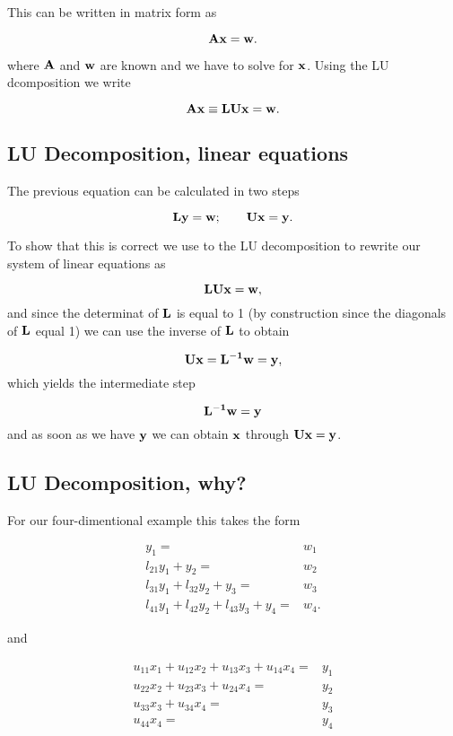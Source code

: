 \documentclass[%
twoside,                 %
final,                   %
10pt]{article}
\begin{document}
{{{{This can be written in matrix form as

\[ {\bf Ax}={\bf w}. \]

where ${\bf A}$ and ${\bf w}$ are known and we have to solve for
${\bf x}$. Using the LU dcomposition we write

\[ {\bf A} {\bf x} \equiv {\bf L} {\bf U} {\bf x} ={\bf w}. \]

\subsection{LU Decomposition, linear equations}

The previous equation can be calculated in two steps

\[ {\bf L} {\bf y} = {\bf w};\qquad {\bf Ux}={\bf y}. \]

To show that this is correct we use to the LU decomposition
to rewrite our system of linear equations as

\[  {\bf LUx}={\bf w}, \]
and since the determinat of ${\bf L}$ is equal to 1 (by construction
since the diagonals of ${\bf L}$ equal 1) we can use the inverse of
${\bf L}$ to obtain

\[
   {\bf Ux}={\bf L^{-1}w}={\bf y},
\]
which yields the intermediate step

\[
   {\bf L^{-1}w}={\bf y}
\]
and as soon as we have ${\bf y}$ we can obtain ${\bf x}$
through ${\bf Ux}={\bf y}$.

\subsection{LU Decomposition, why?}

For our four-dimentional example this takes the form

\begin{align}
 y_1=&w_1 \nonumber\\
l_{21}y_1 + y_2=&w_2\nonumber \\
l_{31}y_1 + l_{32}y_2 + y_3 =&w_3\nonumber \\
l_{41}y_1 + l_{42}y_2 + l_{43}y_3 + y_4=&w_4. \nonumber
\end{align}

and

\begin{align}
 u_{11}x_1 +u_{12}x_2 +u_{13}x_3 + u_{14}x_4=&y_1 \nonumber\\
u_{22}x_2 + u_{23}x_3 + u_{24}x_4=&y_2\nonumber \\
u_{33}x_3 + u_{34}x_4=&y_3\nonumber \\
u_{44}x_4=&y_4  \nonumber
\end{align}

}}}}
\end{document}
